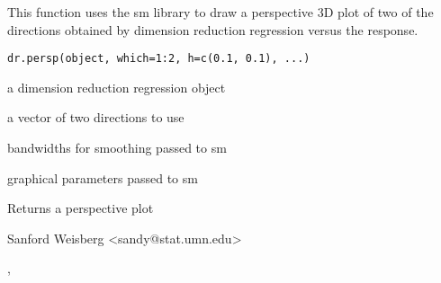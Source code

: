 \begin{Description}\relax
This function uses the sm library to draw a perspective 3D plot of two of
the directions obtained by dimension reduction regression versus the response.
\end{Description}
\begin{Usage}
\begin{verbatim}
dr.persp(object, which=1:2, h=c(0.1, 0.1), ...)
\end{verbatim}
\end{Usage}
\begin{Arguments}
\begin{ldescription}
\item[\code{object}] a dimension reduction regression object 
\item[\code{which}] a vector of two directions to use 
\item[\code{h}] bandwidths for smoothing passed to sm 
\item[\code{...}] graphical parameters passed to sm 
\end{ldescription}
\end{Arguments}
\begin{Value}
Returns a perspective plot
\end{Value}
\begin{Author}\relax
Sanford Weisberg <sandy@stat.umn.edu>
\end{Author}
\begin{SeeAlso}\relax
{}, 
\end{SeeAlso}

